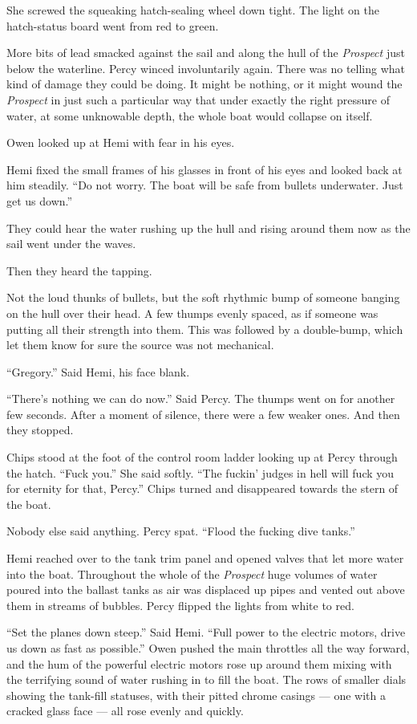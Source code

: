 \documentclass[]{scrbook}
\begin{document}
She screwed the squeaking hatch-sealing wheel down tight. The light on
the hatch-status board went from red to green.

More bits of lead smacked against the sail and along the hull of the
\emph{Prospect} just below the waterline. Percy winced involuntarily
again. There was no telling what kind of damage they could be doing. It
might be nothing, or it might wound the \emph{Prospect} in just such a
particular way that under exactly the right pressure of water, at some
unknowable depth, the whole boat would collapse on itself.

Owen looked up at Hemi with fear in his eyes.

Hemi fixed the small frames of his glasses in front of his eyes and
looked back at him steadily. ``Do not worry. The boat will be safe from
bullets underwater. Just get us down.''

They could hear the water rushing up the hull and rising around them now
as the sail went under the waves.

Then they heard the tapping.

Not the loud thunks of bullets, but the soft rhythmic bump of someone
banging on the hull over their head. A few thumps evenly spaced, as if
someone was putting all their strength into them. This was followed by a
double-bump, which let them know for sure the source was not mechanical.

``Gregory.'' Said Hemi, his face blank.

``There's nothing we can do now.'' Said Percy. The thumps went on for
another few seconds. After a moment of silence, there were a few weaker
ones. And then they stopped.

Chips stood at the foot of the control room ladder looking up at Percy
through the hatch. ``Fuck you.'' She said softly. ``The fuckin' judges
in hell will fuck you for eternity for that, Percy.'' Chips turned and
disappeared towards the stern of the boat.

Nobody else said anything. Percy spat. ``Flood the fucking dive tanks.''

Hemi reached over to the tank trim panel and opened valves that let more
water into the boat. Throughout the whole of the \emph{Prospect} huge
volumes of water poured into the ballast tanks as air was displaced up
pipes and vented out above them in streams of bubbles. Percy flipped the
lights from white to red.

``Set the planes down steep.'' Said Hemi. ``Full power to the electric
motors, drive us down as fast as possible.'' Owen pushed the main
throttles all the way forward, and the hum of the powerful electric
motors rose up around them mixing with the terrifying sound of water
rushing in to fill the boat. The rows of smaller dials showing the
tank-fill statuses, with their pitted chrome casings --- one with a
cracked glass face --- all rose evenly and quickly.
\end{document}
